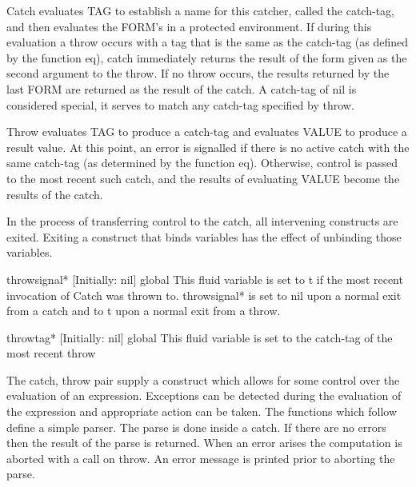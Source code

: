 {    Catch  evaluates  TAG  to establish a name for this catcher,
    called the catch-tag, and then evaluates  the  FORM's  in  a
    protected  environment.   If  during this evaluation a throw
    occurs with a tag that is the  same  as  the  catch-tag  (as
    defined  by  the function eq), catch immediately returns the
    result of the form given  as  the  second  argument  to  the
    throw.      If  no throw occurs, the results returned by the
    last FORM are returned as  the  result  of  the  catch.    A
    catch-tag  of  nil is considered special, it serves to match
    any catch-tag specified by throw.
}

{    Throw evaluates TAG to produce  a  catch-tag  and  evaluates
    VALUE to produce a result value.  At this point, an error is
    signalled  if  there  is  no  active  catch  with  the  same
    catch-tag (as determined by the function  eq).    Otherwise,
    control  is  passed  to  the most recent such catch, and the
    results of evaluating VALUE become the results of the catch.
}
    
				In the process of transferring control  to  the  catch,  all
    intervening constructs are exited.  Exiting a construct that
    binds variables has the effect of unbinding those variables.

throwsignal* [Initially: nil]                             global
    This  fluid  variable  is  set  to  t  if  the  most  recent
    invocation of Catch was thrown to.  throwsignal*  is set  to
    nil  upon  a normal exit from a catch and to t upon a normal
    exit from a throw.

throwtag* [Initially: nil]                                global
    This fluid variable is set to  the  catch-tag  of  the  most
    recent throw

  The catch, throw pair supply a construct which allows for some
control over the evaluation of an expression.  Exceptions can be
detected during the evaluation of the expression and appropriate
action can be taken.  The functions which follow define a simple
parser.    The  parse  is  done inside a catch.  If there are no
errors then the result of the parse is returned.  When an  error
arises  the  computation  is  aborted  with a call on throw.  An
error message is printed prior to aborting the parse.

